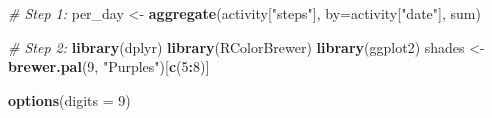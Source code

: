 \documentclass[]{article}
\newenvironment{Shaded}{\begin{snugshade}}{\end{snugshade}}
\newcommand{\KeywordTok}[1]{\textcolor[rgb]{0.13,0.29,0.53}{\textbf{#1}}}
\newcommand{\DataTypeTok}[1]{\textcolor[rgb]{0.13,0.29,0.53}{#1}}
\newcommand{\DecValTok}[1]{\textcolor[rgb]{0.00,0.00,0.81}{#1}}
\newcommand{\StringTok}[1]{\textcolor[rgb]{0.31,0.60,0.02}{#1}}
\newcommand{\CommentTok}[1]{\textcolor[rgb]{0.56,0.35,0.01}{\textit{#1}}}
\newcommand{\OperatorTok}[1]{\textcolor[rgb]{0.81,0.36,0.00}{\textbf{#1}}}
\newcommand{\NormalTok}[1]{#1}
\begin{document}
\begin{Shaded}
\begin{Highlighting}[]
\CommentTok{# Step 1:}
\NormalTok{per_day <-}\StringTok{ }\KeywordTok{aggregate}\NormalTok{(activity[}\StringTok{"steps"}\NormalTok{], }\DataTypeTok{by=}\NormalTok{activity[}\StringTok{"date"}\NormalTok{], sum)}

\CommentTok{# Step 2:}
\KeywordTok{library}\NormalTok{(dplyr)}
\KeywordTok{library}\NormalTok{(RColorBrewer)}
\KeywordTok{library}\NormalTok{(ggplot2)}
\NormalTok{shades <-}\StringTok{ }\KeywordTok{brewer.pal}\NormalTok{(}\DecValTok{9}\NormalTok{, }\StringTok{"Purples"}\NormalTok{)[}\KeywordTok{c}\NormalTok{(}\DecValTok{5}\OperatorTok{:}\DecValTok{8}\NormalTok{)]}

\KeywordTok{options}\NormalTok{(}\DataTypeTok{digits =} \DecValTok{9}\NormalTok{)}


\end{Highlighting}
\end{Shaded}
\end{document}
